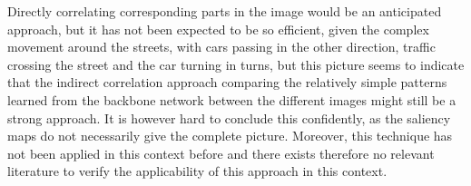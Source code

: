 Directly correlating corresponding parts in the image would be an anticipated approach, but it has not been expected to be so efficient, given the complex movement around the streets, with cars passing in the other direction, traffic crossing the street and the car turning in turns, but this picture seems to indicate that the indirect correlation approach comparing the relatively simple patterns learned from the backbone network between the different images might still be a strong approach. It is however hard to conclude this confidently, as the saliency maps do not necessarily give the complete picture. Moreover, this technique has not been applied in this context before and there exists therefore no relevant literature to verify the applicability of this approach in this context.

